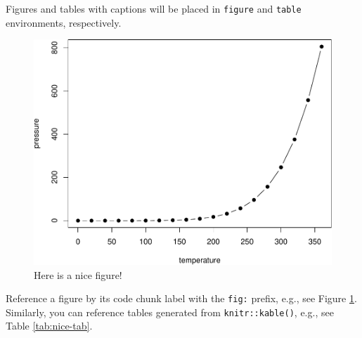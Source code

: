 \documentclass[
]{book}
\begin{document}
Figures and tables with captions will be placed in \texttt{figure} and \texttt{table} environments, respectively.

\begin{figure}

{\centering \includegraphics[width=0.8\linewidth]{bookdown-demo_files/figure-latex/nice-fig-1} 

}

\caption{Here is a nice figure!}\label{fig:nice-fig}
\end{figure}

Reference a figure by its code chunk label with the \texttt{fig:} prefix, e.g., see Figure \ref{fig:nice-fig}. Similarly, you can reference tables generated from \texttt{knitr::kable()}, e.g., see Table \ref{tab:nice-tab}.
\end{document}
